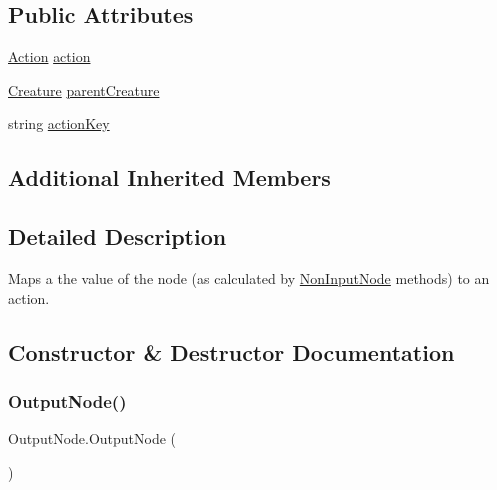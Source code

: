 \subsection*{Public Attributes}
\begin{DoxyCompactItemize}
\item 
\mbox{\hyperlink{class_action}{Action}} \mbox{\hyperlink{class_output_node_a330eb0533baf20b237f93627106d6b56}{action}}
\item 
\mbox{\hyperlink{class_creature}{Creature}} \mbox{\hyperlink{class_output_node_a4be36782d750ac8d91c0f51628d353fb}{parent\+Creature}}
\item 
string \mbox{\hyperlink{class_output_node_a48299e62ef82f692d8656d0efec1b236}{action\+Key}}
\end{DoxyCompactItemize}
\subsection*{Additional Inherited Members}


\subsection{Detailed Description}
Maps a the value of the node (as calculated by \mbox{\hyperlink{class_non_input_node}{Non\+Input\+Node}} methods) to an action. 



\subsection{Constructor \& Destructor Documentation}
\mbox{\label{class_output_node_abf3c6c3ab42fb35f64e894a15f0d057e}} 
\subsubsection{\texorpdfstring{Output\+Node()}{OutputNode()}\hspace{0.1cm}{\footnotesize\ttfamily [1/2]}}
{\footnotesize\ttfamily Output\+Node.\+Output\+Node (\begin{DoxyParamCaption}{ }\end{DoxyParamCaption})}

\mbox{\label{class_output_node_ab065c6d98c883b8416acbc5add709013}} 

